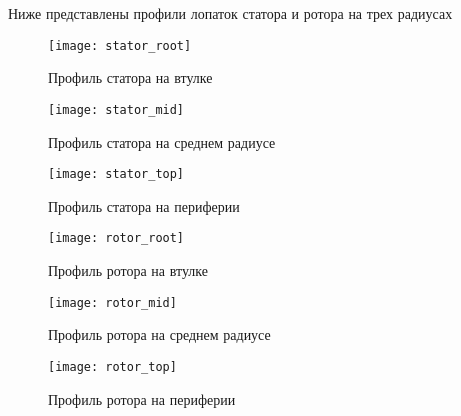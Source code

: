 Ниже представлены профили лопаток статора и ротора на трех радиусах
    \begin{figure}
        \centering
        \texttt{[image: stator\_root]}
        \caption{Профиль статора на втулке}
    \end{figure}

    \begin{figure}
        \centering
        \texttt{[image: stator\_mid]}
        \caption{Профиль статора на среднем радиусе}
    \end{figure}

    \begin{figure}
        \centering
        \texttt{[image: stator\_top]}
        \caption{Профиль статора на периферии}
    \end{figure}

    \begin{figure}
        \centering
        \texttt{[image: rotor\_root]}
        \caption{Профиль ротора на втулке}
    \end{figure}

    \begin{figure}
        \centering
        \texttt{[image: rotor\_mid]}
        \caption{Профиль ротора на среднем радиусе}
    \end{figure}

    \begin{figure}
        \centering
        \texttt{[image: rotor\_top]}
        \caption{Профиль ротора на периферии}
    \end{figure}
